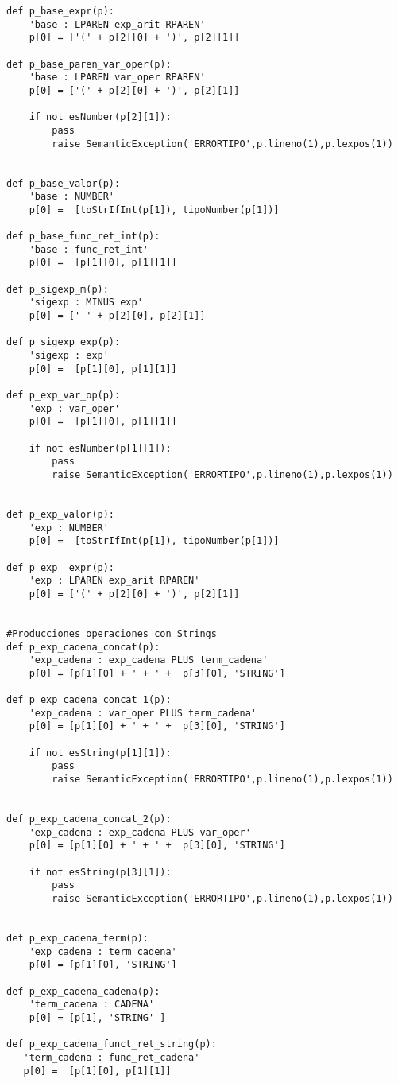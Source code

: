 \begin{verbatim}
def p_base_expr(p):
    'base : LPAREN exp_arit RPAREN'
    p[0] = ['(' + p[2][0] + ')', p[2][1]]

def p_base_paren_var_oper(p):
    'base : LPAREN var_oper RPAREN'
    p[0] = ['(' + p[2][0] + ')', p[2][1]]

    if not esNumber(p[2][1]):
        pass
        raise SemanticException('ERRORTIPO',p.lineno(1),p.lexpos(1))


def p_base_valor(p):
    'base : NUMBER'
    p[0] =  [toStrIfInt(p[1]), tipoNumber(p[1])] 

def p_base_func_ret_int(p):
    'base : func_ret_int'
    p[0] =  [p[1][0], p[1][1]] 

def p_sigexp_m(p):
    'sigexp : MINUS exp'
    p[0] = ['-' + p[2][0], p[2][1]]

def p_sigexp_exp(p):
    'sigexp : exp'
    p[0] =  [p[1][0], p[1][1]]

def p_exp_var_op(p):
    'exp : var_oper'
    p[0] =  [p[1][0], p[1][1]]

    if not esNumber(p[1][1]):
        pass
        raise SemanticException('ERRORTIPO',p.lineno(1),p.lexpos(1))


def p_exp_valor(p):
    'exp : NUMBER'
    p[0] =  [toStrIfInt(p[1]), tipoNumber(p[1])]

def p_exp__expr(p):
    'exp : LPAREN exp_arit RPAREN'
    p[0] = ['(' + p[2][0] + ')', p[2][1]]


#Producciones operaciones con Strings
def p_exp_cadena_concat(p):
    'exp_cadena : exp_cadena PLUS term_cadena'
    p[0] = [p[1][0] + ' + ' +  p[3][0], 'STRING']

def p_exp_cadena_concat_1(p):
    'exp_cadena : var_oper PLUS term_cadena'
    p[0] = [p[1][0] + ' + ' +  p[3][0], 'STRING']

    if not esString(p[1][1]):
        pass
        raise SemanticException('ERRORTIPO',p.lineno(1),p.lexpos(1))


def p_exp_cadena_concat_2(p):
    'exp_cadena : exp_cadena PLUS var_oper'
    p[0] = [p[1][0] + ' + ' +  p[3][0], 'STRING']

    if not esString(p[3][1]):
        pass
        raise SemanticException('ERRORTIPO',p.lineno(1),p.lexpos(1))


def p_exp_cadena_term(p):
    'exp_cadena : term_cadena'
    p[0] = [p[1][0], 'STRING']

def p_exp_cadena_cadena(p):
    'term_cadena : CADENA'
    p[0] = [p[1], 'STRING' ]

def p_exp_cadena_funct_ret_string(p):
   'term_cadena : func_ret_cadena'
   p[0] =  [p[1][0], p[1][1]] 


\end{verbatim}
